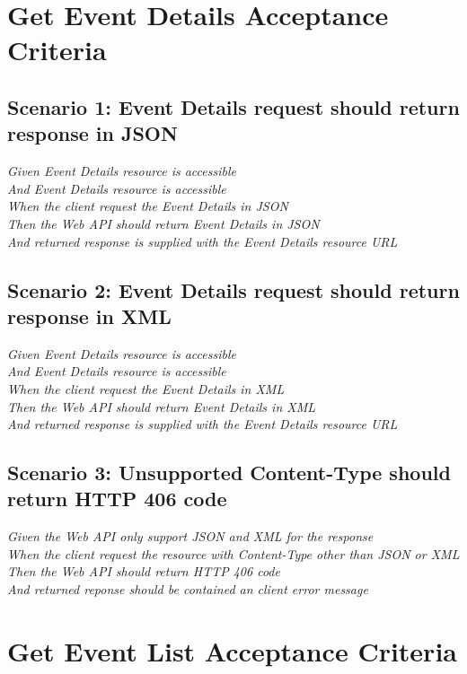 \documentclass[a4paper, 12pt, oneside]{report}
\begin{document}
\section{Get Event Details Acceptance Criteria}
\subsection{Scenario 1: Event Details request should return response in JSON}

\onehalfspacing \textit{Given Event Details resource is accessible\\
And Event Details resource is accessible\\
When the client request the Event Details in JSON\\
Then the Web API should return Event Details in JSON\\
And returned response is supplied with the Event Details resource URL\\}

\subsection{Scenario 2: Event Details request should return response in XML}

\onehalfspacing \textit{Given Event Details resource is accessible\\
And Event Details resource is accessible\\
When the client request the Event Details in XML\\
Then the Web API should return Event Details in XML\\
And returned response is supplied with the Event Details resource URL\\}

\subsection{Scenario 3: Unsupported Content-Type should return HTTP 406 code}

\onehalfspacing \textit{Given the Web API only support JSON and XML for the response\\
When the client request the resource with Content-Type other than JSON or XML\\
Then the Web API should return HTTP 406 code\\
And returned reponse should be contained an client error message}

\section{Get Event List Acceptance Criteria}
\end{document}
